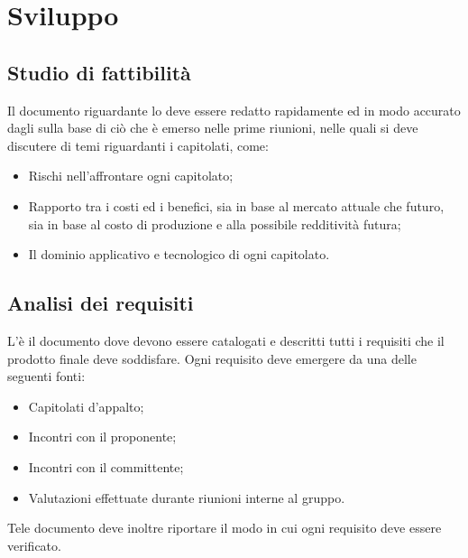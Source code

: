 \documentclass[../NormeProgetto.tex]{subfiles}
\begin{document}
\section{Sviluppo}
	\subsection{Studio di fattibilità}
	Il documento riguardante lo \studiodifattibilita deve essere redatto rapidamente ed in modo accurato dagli \analisti sulla base di ciò che è emerso nelle prime riunioni, nelle quali si deve discutere di temi riguardanti i capitolati, come:
	\begin{itemize}
		\item Rischi nell'affrontare ogni capitolato;
		\item Rapporto tra i costi ed i benefici, sia in base al mercato attuale che futuro, sia in base al costo di produzione e alla possibile redditività futura;
		\item Il dominio applicativo e tecnologico di ogni capitolato.
	\end{itemize}
	\subsection{Analisi dei requisiti}
	L'\analisideirequisiti è il documento dove devono essere catalogati e descritti tutti i requisiti che il prodotto finale deve soddisfare. Ogni requisito deve emergere da una delle seguenti fonti:
	\begin{itemize}
		\item Capitolati d'appalto;
		\item Incontri con il proponente;
		\item Incontri con il committente;
		\item Valutazioni effettuate durante riunioni interne al gruppo.
	\end{itemize}
	Tele documento deve inoltre riportare il modo in cui ogni requisito deve essere verificato.
\end{document}
